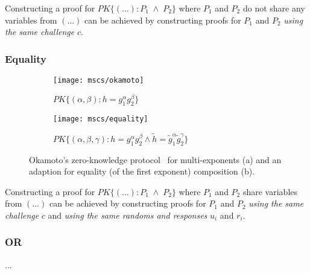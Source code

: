 Constructing a proof for $PK\{(\dots) : P_1 \;\land\; P_2 \}$ where $P_1$ and $P_2$ do not share any variables from $(\dots)$ can be achieved by constructing proofs for $P_1$ and $P_2$ \emph{using the same challenge} $c$.

\subsubsection{Equality}

\begin{figure}
  \centering
  \begin{subfigure}[b]{0.45\textwidth}
    \texttt{[image: mscs/okamoto]}
    \caption{$PK\{(\alpha, \beta) : h = g_1^\alpha g_2^\beta \}$}
    \label{msc:okamoto}
  \end{subfigure}
  \quad
  \begin{subfigure}[b]{0.45\textwidth}
    \texttt{[image: mscs/equality]}
    \caption{$PK\{(\alpha, \beta, \gamma) : h = g_1^\alpha g_2^\beta \land \tilde{h} = \tilde{g}_1^\alpha \tilde{g}_2^\gamma\}$}
    \label{msc:equality}
  \end{subfigure}
  \caption{Okamoto's zero-knowledge protocol~\cite{Okamoto1993} for multi-exponents (a) and an adaption for equality (of the first exponent) composition (b).}
  \label{fig:okamoto}
\end{figure}

Constructing a proof for $PK\{(\dots) : P_1 \;\land\; P_2 \}$ where $P_1$ and $P_2$ share variables from $(\dots)$ can be achieved by constructing proofs for $P_1$ and $P_2$ \emph{using the same challenge} $c$ and \emph{using the same randoms and responses} $u_i$ and $r_i$.


\subsubsection{OR} ...


